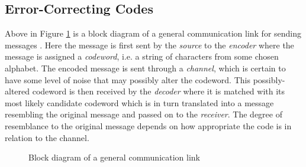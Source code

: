 \documentclass[conference]{IEEEtran}
\theoremstyle{definition}
\begin{document}
\subsection{Error-Correcting Codes}
Above in Figure \ref{comm_link} is a block diagram of a general
communication link for sending messages \cite{clanton2005maa}.
Here the message is first sent by the \emph{source} to the
\emph{encoder} where the message is assigned a \emph{codeword},
i.e. a string of characters from some chosen alphabet.  The
encoded message is sent through a \emph{channel}, which is
certain to have some level of noise that may possibly alter
the codeword.  This possibly-altered codeword is then received
by the \emph{decoder} where it is matched with its most likely
candidate codeword which is in turn translated into a message
resembling the original message and passed on to the \emph{receiver}.
The degree of resemblance to the original message depends
on how appropriate the code is in relation to the channel.\\





\begin{figure}[!t]                                                          %
\centering                                                                  %
\resizebox{0.45\textwidth}{!}{}
\caption{Block diagram of a general communication link}                     %
\label{comm_link}                                                           %
\end{figure}                                                                %
\end{document}

